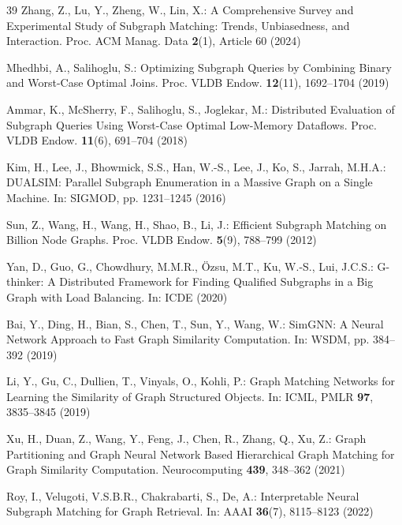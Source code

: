 \documentclass{article}
\begin{document}
{\begin{thebibliography}{39}
Zhang, Z., Lu, Y., Zheng, W., Lin, X.: A Comprehensive Survey and Experimental Study of Subgraph Matching: Trends, Unbiasedness, and Interaction. Proc. ACM Manag. Data \textbf{2}(1), Article 60 (2024)

Mhedhbi, A., Salihoglu, S.: Optimizing Subgraph Queries by Combining Binary and Worst-Case Optimal Joins. Proc. VLDB Endow. \textbf{12}(11), 1692--1704 (2019)

Ammar, K., McSherry, F., Salihoglu, S., Joglekar, M.: Distributed Evaluation of Subgraph Queries Using Worst-Case Optimal Low-Memory Dataflows. Proc. VLDB Endow. \textbf{11}(6), 691--704 (2018)

Kim, H., Lee, J., Bhowmick, S.S., Han, W.-S., Lee, J., Ko, S., Jarrah, M.H.A.: DUALSIM: Parallel Subgraph Enumeration in a Massive Graph on a Single Machine. In: SIGMOD, pp. 1231--1245 (2016)

Sun, Z., Wang, H., Wang, H., Shao, B., Li, J.: Efficient Subgraph Matching on Billion Node Graphs. Proc. VLDB Endow. \textbf{5}(9), 788--799 (2012)

Yan, D., Guo, G., Chowdhury, M.M.R., \"{O}zsu, M.T., Ku, W.-S., Lui, J.C.S.: G-thinker: A Distributed Framework for Finding Qualified Subgraphs in a Big Graph with Load Balancing. In: ICDE (2020)

Bai, Y., Ding, H., Bian, S., Chen, T., Sun, Y., Wang, W.: SimGNN: A Neural Network Approach to Fast Graph Similarity Computation. In: WSDM, pp. 384--392 (2019)

Li, Y., Gu, C., Dullien, T., Vinyals, O., Kohli, P.: Graph Matching Networks for Learning the Similarity of Graph Structured Objects. In: ICML, PMLR \textbf{97}, 3835--3845 (2019)

Xu, H., Duan, Z., Wang, Y., Feng, J., Chen, R., Zhang, Q., Xu, Z.: Graph Partitioning and Graph Neural Network Based Hierarchical Graph Matching for Graph Similarity Computation. Neurocomputing \textbf{439}, 348--362 (2021)

Roy, I., Velugoti, V.S.B.R., Chakrabarti, S., De, A.: Interpretable Neural Subgraph Matching for Graph Retrieval. In: AAAI \textbf{36}(7), 8115--8123 (2022)


\end{thebibliography}}
\end{document}
